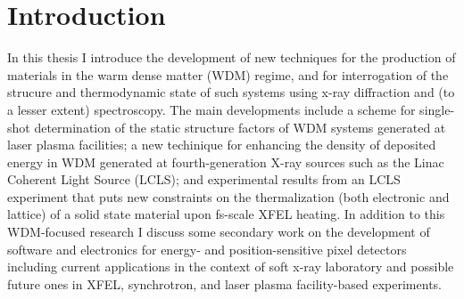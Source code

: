 
\chapter{Introduction} %

\label{Introduction} %


\newcommand{\keyword}[1]{\textbf{#1}}
\newcommand{\tabhead}[1]{\textbf{#1}}
\newcommand{\code}[1]{\texttt{#1}}
\newcommand{\file}[1]{\texttt{\bfseries#1}}
\newcommand{\option}[1]{\texttt{\itshape#1}}


In this thesis I introduce the development of new techniques for the production of materials in the warm dense matter (WDM) regime, and for interrogation of the strucure and thermodynamic state of such systems using x-ray diffraction and (to a lesser extent) spectroscopy. The main developments include a scheme for single-shot determination of the static structure factors of WDM systems generated at laser plasma facilities; a new techinique for enhancing the density of deposited energy in WDM generated at fourth-generation X-ray sources such as the Linac Coherent Light Source (LCLS); and experimental results from an LCLS experiment that puts new constraints on the thermalization (both electronic and lattice) of a solid state material upon fs-scale XFEL heating. In addition to this WDM-focused research I discuss some secondary work on the development of software and electronics for energy- and position-sensitive pixel detectors including current applications in the context of soft x-ray laboratory and possible future ones in XFEL, synchrotron, and laser plasma facility-based experiments.

